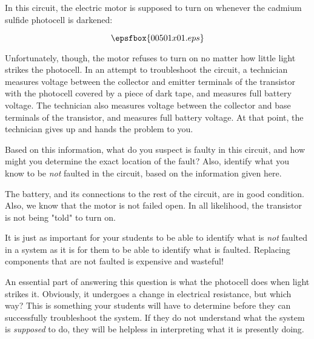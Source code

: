 

In this circuit, the electric motor is supposed to turn on whenever the cadmium sulfide photocell is darkened:

$$\epsfbox{00501x01.eps}$$

Unfortunately, though, the motor refuses to turn on no matter how little light strikes the photocell.  In an attempt to troubleshoot the circuit, a technician measures voltage between the collector and emitter terminals of the transistor with the photocell covered by a piece of dark tape, and measures full battery voltage.  The technician also measures voltage between the collector and base terminals of the transistor, and measures full battery voltage.  At that point, the technician gives up and hands the problem to you.

Based on this information, what do you suspect is faulty in this circuit, and how might you determine the exact location of the fault?  Also, identify what you know to be {\it not} faulted in the circuit, based on the information given here.
 






The battery, and its connections to the rest of the circuit, are in good condition.  Also, we know that the motor is not failed open.  In all likelihood, the transistor is not being "told" to turn on.







It is just as important for your students to be able to identify what is {\it not} faulted in a system as it is for them to be able to identify what is faulted.  Replacing components that are not faulted is expensive and wasteful!

An essential part of answering this question is what the photocell does when light strikes it.  Obviously, it undergoes a change in electrical resistance, but which way?  This is something your students will have to determine before they can successfully troubleshoot the system.  If they do not understand what the system is {\it supposed} to do, they will be helpless in interpreting what it is presently doing.




